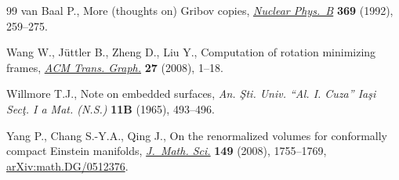 \documentclass[10pt,a4paper]{article}
\numberwithin{equation}{section}
\renewcommand{\=}{\stackrel \Lambda =}
\providecommand{\LastPageEnding}{}
\begin{document}
\begin{thebibliography}{99}
van Baal P., More (thoughts on) {G}ribov copies, \href{https://doi.org/10.1016/0550-3213(92)90386-P}{\textit{Nuclear Phys.~B}}
 \textbf{369} (1992), 259--275.

Wang W., J\"uttler B., Zheng D., Liu Y., Computation of rotation minimizing
 frames, \href{https://doi.org/10.1145/1330511.1330513}{\textit{ACM Trans. Graph.}} \textbf{27} (2008), 1--18.

Willmore T.J., Note on embedded surfaces, \textit{An. \c{S}ti. Univ. ``Al. I.
 Cuza'' Ia\c{s}i Sec\c{t}. I a Mat. (N.S.)} \textbf{11B} (1965), 493--496.

Yang P., Chang S.-Y.A., Qing J., On the renormalized volumes for conformally
 compact {E}instein manifolds, \href{https://doi.org/10.1007/s10958-008-0094-0}{\textit{J.~Math. Sci.}} \textbf{149} (2008),
 1755--1769, \href{https://arxiv.org/abs/math.DG/0512376}{arXiv:math.DG/0512376}.

\end{thebibliography}\LastPageEnding
\end{document}
